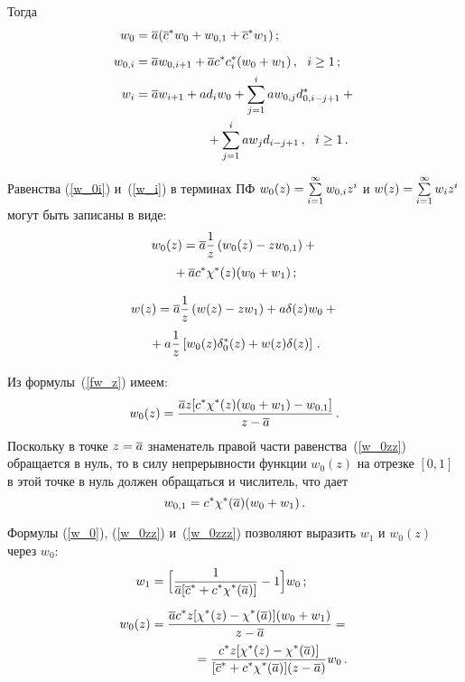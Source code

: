\begin{multicols}{2}
Тогда
\begin{align}
\label{w_0}
w_0 &= \a (\oc^* w_0 + w_{0,1} + \oc^* w_1)\,;
\\[6pt]
\label{w_0i}
w_{0,i} &= \a w_{0,i+1} + \a c^* c^*_i (w_0 + w_1)\,,
\ \ i\ge 1\,;
\\
\label{w_i}
w_{i} &= \a w_{i+1} + a d_i w_0 + \sum_{j=1}^i a w_{0,j} d^{*}_{0,i-j+1} +{}\notag\\
&\hspace*{20mm}{}+ \sum_{j=1}^i
a w_{j} d_{i-j+1}\,,
\ \ i\ge 1\,.
\end{align}

Равенства (\ref{w_0i}) и~(\ref{w_i}) в терминах ПФ
$w_{0}(z)\hm=\sum\limits_{i=1}^\infty w_{0,i} z^i$
и $w(z)\hm=\sum\limits_{i=1}^\infty w_{i} z^i$
могут быть записаны в виде:
\begin{multline}
\label{fw_z}
w_{0}(z)=\overline a \displaystyle\frac{\displaystyle 1 \mathstrut}{\displaystyle z\mathstrut} \left(w_0(z) - z w_{0,1}\right)+{}\\
{}+\overline a c^* \chi^*(z) (w_0 + w_1)\,;
\end{multline}

\vspace*{-12pt}

\noindent
\begin{multline}
\label{fw_0z}
w(z) = \overline a \displaystyle\frac{\displaystyle 1\mathstrut}{\displaystyle z\mathstrut} \left(w(z) - zw_{1}\right)
+ a \delta(z) w_0 +{}\\
{}+ a \displaystyle\frac{\displaystyle 1\mathstrut}{\displaystyle z\mathstrut} \left[w_{0}(z) \delta^{*}_0(z) + w(z) \delta(z)\right]\,.
\end{multline}

Из формулы~(\ref{fw_z}) имеем:
\begin{equation}
\label{w_0zz}
w_{0}(z) = \displaystyle\frac{\displaystyle \overline a z [c^* \chi^*(z) (w_0 + w_1) - w_{0,1}] \mathstrut}{\displaystyle z - \overline a\mathstrut}\,.
\end{equation}
Поскольку в точке $z=\overline a$ знаменатель правой части равенства~(\ref{w_0zz})
обращается в нуль, то в силу непрерывности
функции $w_{0}(z)$ на отрезке $[0,1]$ в этой точке в нуль
должен обращаться и числитель, что дает
\begin{equation}
\label{w_0zzz}
w_{0,1}= c^* \chi^*(\overline a) (w_0 + w_1)\,.
\end{equation}

Формулы (\ref{w_0}), (\ref{w_0zz}) и~(\ref{w_0zzz})
позволяют выразить $w_{1}$ и $w_0(z)$ через $w_0$:
\begin{align}
w_1 &= \Big[ \fr{1}{\a [\oc^* + c^* \chi^*(\a)]} - 1
\Big] w_0\,;\notag\\[6pt]
\label{qw_0zz}
w_{0}(z) &= \fr{\a c^* z [\chi^*(z) - \chi^*(\a)](w_0 + w_1) }{z - \a}
={}\notag\\
&\hspace*{12mm}{}= \fr{c^* z [\chi^*(z) - \chi^*(\a)] }{[\oc^* + c^* \chi^*(\a)] (z - \a)} w_0\,.
\end{align}


\end{multicols}
